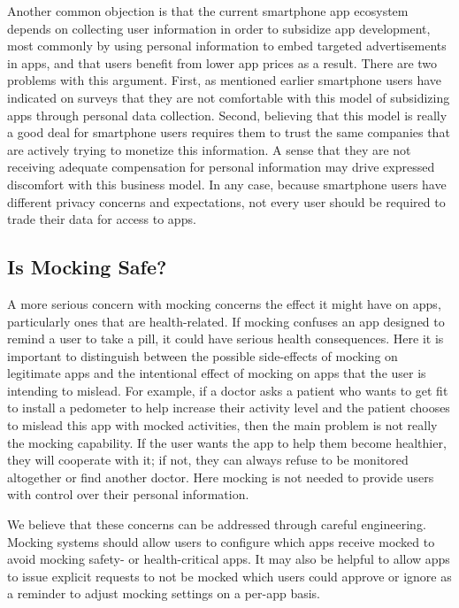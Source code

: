 Another common objection is that the current smartphone app ecosystem depends
on collecting user information in order to subsidize app development, most
commonly by using personal information to embed targeted advertisements in
apps, and that users benefit from lower app prices as a result. There are two
problems with this argument. First, as mentioned earlier smartphone users
have indicated on surveys that they are not comfortable with this model of
subsidizing apps through personal data collection. Second, believing that
this model is really a good deal for smartphone users requires them to trust
the same companies that are actively trying to monetize this information. A
sense that they are not receiving adequate compensation for personal
information may drive expressed discomfort with this business model. In any
case, because smartphone users have different privacy concerns and
expectations, not every user should be required to trade their data for
access to apps.

\subsection{Is Mocking Safe?}

A more serious concern with mocking concerns the effect it might have on
apps, particularly ones that are health-related. If mocking confuses an app
designed to remind a user to take a pill, it could have serious health
consequences. Here it is important to distinguish between the possible
side-effects of mocking on legitimate apps and the intentional effect of
mocking on apps that the user is intending to mislead. For example, if a
doctor asks a patient who wants to get fit to install a pedometer to help
increase their activity level and the patient chooses to mislead this app
with mocked activities, then the main problem is not really the mocking
capability. If the user wants the app to help them become healthier, they
will cooperate with it; if not, they can always refuse to be monitored
altogether or find another doctor. Here mocking is not needed to provide
users with control over their personal information.

We believe that these concerns can be addressed through careful engineering.
Mocking systems should allow users to configure which apps receive mocked
to avoid mocking safety- or health-critical apps. It may also be helpful to
allow apps to issue explicit requests to not be mocked which users could
approve or ignore as a reminder to adjust mocking settings on a per-app
basis.

